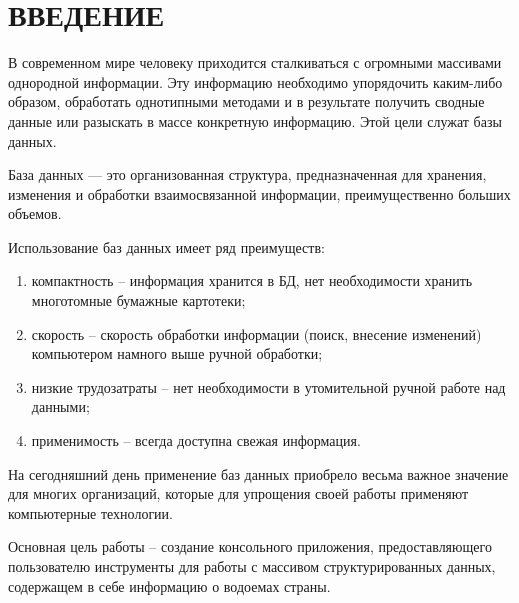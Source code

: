 \newpage

\section*{ВВЕДЕНИЕ} %

В современном мире человеку приходится сталкиваться с огромными массивами однородной информации. Эту информацию необходимо упорядочить каким-либо образом, обработать однотипными методами и в результате получить сводные данные или разыскать в массе конкретную информацию. Этой цели служат базы данных.

База данных — это организованная структура, предназначенная для хранения, изменения и обработки взаимосвязанной информации, преимущественно больших объемов.

Использование баз данных имеет ряд преимуществ:

\begin{enumerate}
    \item компактность – информация хранится в БД, нет необходимости хранить многотомные бумажные картотеки;
    \item скорость – скорость обработки информации (поиск, внесение изменений) компьютером намного выше ручной обработки;
    \item низкие трудозатраты – нет необходимости в утомительной ручной работе над данными;
    \item применимость – всегда доступна свежая информация.
\end{enumerate}

На сегодняшний день применение баз данных приобрело весьма важное значение для многих организаций, которые для упрощения своей работы применяют компьютерные технологии.

Основная цель работы – создание консольного приложения, предоставляющего пользователю инструменты для работы с массивом структурированных данных, содержащем в себе информацию о водоемах страны.

\newpage